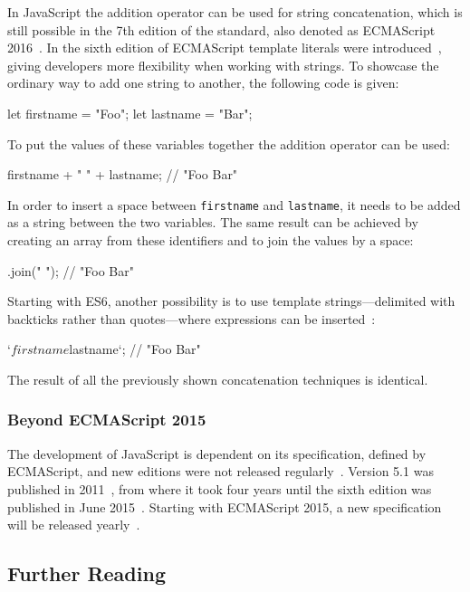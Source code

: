 In JavaScript the addition operator can be used for string concatenation, which is still possible in the 7th edition of the standard, also denoted as ECMAScript 2016~\cite{ES2016SpecOnline:Ecma:2016}. In the sixth edition of ECMAScript template literals were introduced~\cites[p.~148]{ES6Spec:Ecma:2015}[pp.~47--48]{YDKJS:ES6AndBeyond:Simpson:2015}, giving developers more flexibility when working with strings. To showcase the ordinary way to add one string to another, the following code is given:
\begin{JsCode}[numbers=none]
let firstname = "Foo";
let lastname = "Bar";
\end{JsCode}
To put the values of these variables together the addition operator can be used:
\begin{JsCode}[numbers=none]
firstname + " " + lastname; // "Foo Bar"
\end{JsCode}
In order to insert a space between \texttt{firstname} and \texttt{lastname}, it needs to be added as a string between the two variables. The same result can be achieved by creating an array from these identifiers and to join the values by a space:
\begin{JsCode}.join(" "); // "Foo Bar"
\end{JsCode}
Starting with ES6, another possibility is to use template strings---delimited with backticks rather than quotes---where expressions can be inserted~\cite[p.~48]{YDKJS:ES6AndBeyond:Simpson:2015}:
\begin{JsCode}[numbers=none]
`${firstname} ${lastname}`; // "Foo Bar"
\end{JsCode}
The result of all the previously shown concatenation techniques is identical.

\subsubsection{Beyond ECMAScript 2015}

The development of JavaScript is dependent on its specification, defined by ECMAScript, and new editions were not released regularly~\cite{ECMA262Archive:Ecma}. Version 5.1 was published in 2011~\cite{ESSpecOnline:Ecma:2011}, from where it took four years until the sixth edition was published in June 2015~\cite{ES2015SpecOnline:Ecma:2015}. Starting with ECMAScript 2015, a new specification will be released yearly~\cite{ECMAScriptNextSupportInMozilla:Mozilla:2017}.

\subsection{Further Reading}
\label{sec:further reading}

